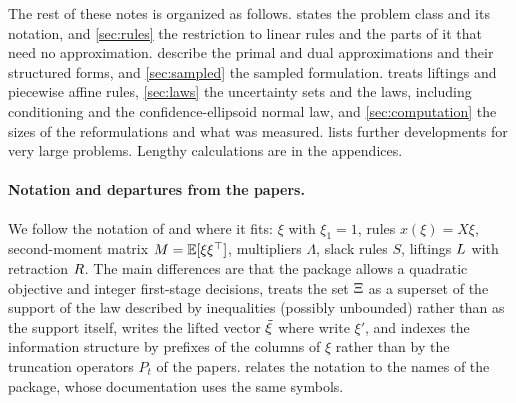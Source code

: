 The rest of these notes is organized as follows.
 states the problem class and its notation,
and \cref{sec:rules} the restriction to linear rules and the parts of it that need no approximation.
 describe the primal and dual approximations and their structured forms,
and \cref{sec:sampled} the sampled formulation.
 treats liftings and piecewise affine rules,
\cref{sec:laws} the uncertainty sets and the laws, including conditioning and the confidence-ellipsoid normal law,
and \cref{sec:computation} the sizes of the reformulations and what was measured.
 lists further developments for very large problems.
Lengthy calculations are in the appendices.

\paragraph{Notation and departures from the papers.}
We follow the notation of \citet{KWG2011} and \citet{GWK2015} where it fits:
$\xi$ with $\xi_1 = 1$, rules $x(\xi) = X\xi$, second-moment matrix $M = \mathbb{E}[\xi\xi^\top]$, multipliers $\Lambda$, slack rules $S$, liftings $L$ with retraction $R$.
The main differences are that the package
allows a quadratic objective and integer first-stage decisions,
treats the set $\Xi$ as a superset of the support of the law described by inequalities (possibly unbounded) rather than as the support itself,
writes the lifted vector $\tilde\xi$ where \citet{GWK2015} write $\xi'$,
and indexes the information structure by prefixes of the columns of $\xi$ rather than by the truncation operators $P_t$ of the papers.
 relates the notation to the names of the package, whose documentation uses the same symbols.

